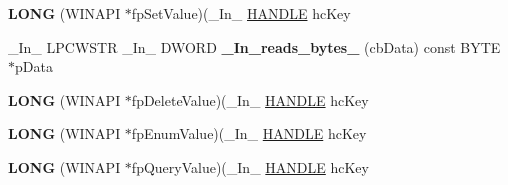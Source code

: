 \begin{DoxyCompactItemize}
\item 
\mbox{\label{struct___m_o_n_i_t_o_r_r_e_g_ac55d60209e1dc8a10e39c66969a83ede}} 
{\bfseries L\+O\+NG} (W\+I\+N\+A\+PI $\ast$fp\+Set\+Value)(\+\_\+\+In\+\_\+ \hyperlink{interfacevoid}{H\+A\+N\+D\+LE} hc\+Key
\item 
\mbox{\label{struct___m_o_n_i_t_o_r_r_e_g_a7204e1de507fb8360bceda6d4cef95f2}} 
\+\_\+\+In\+\_\+ L\+P\+C\+W\+S\+TR \+\_\+\+In\+\_\+ D\+W\+O\+RD {\bfseries \+\_\+\+In\+\_\+reads\+\_\+bytes\+\_\+} (cb\+Data) const B\+Y\+TE $\ast$p\+Data
\item 
\mbox{\label{struct___m_o_n_i_t_o_r_r_e_g_a25cd7948a755e67bda768b2e7cee692d}} 
{\bfseries L\+O\+NG} (W\+I\+N\+A\+PI $\ast$fp\+Delete\+Value)(\+\_\+\+In\+\_\+ \hyperlink{interfacevoid}{H\+A\+N\+D\+LE} hc\+Key
\item 
\mbox{\label{struct___m_o_n_i_t_o_r_r_e_g_a8fc445ba0fe87d9add9a7c93ef57a06a}} 
{\bfseries L\+O\+NG} (W\+I\+N\+A\+PI $\ast$fp\+Enum\+Value)(\+\_\+\+In\+\_\+ \hyperlink{interfacevoid}{H\+A\+N\+D\+LE} hc\+Key
\item 
\mbox{\label{struct___m_o_n_i_t_o_r_r_e_g_aa73d63e80a3a9608f4c21bd6fac3bd26}} 
{\bfseries L\+O\+NG} (W\+I\+N\+A\+PI $\ast$fp\+Query\+Value)(\+\_\+\+In\+\_\+ \hyperlink{interfacevoid}{H\+A\+N\+D\+LE} hc\+Key
\end{DoxyCompactItemize}
